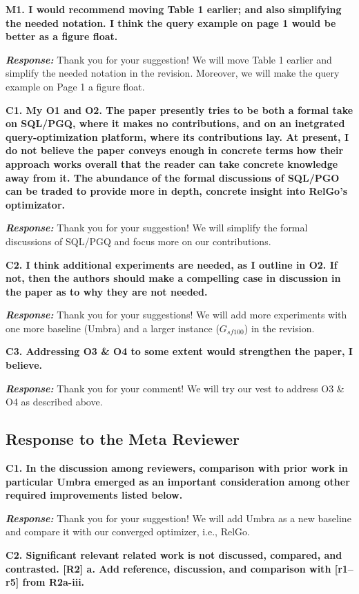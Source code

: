 \textbf{M1. I would recommend moving Table 1 earlier; and also simplifying the needed notation. I think the query example on page 1 would be better as a figure float. }

\textbf{\textit{Response: }}
Thank you for your suggestion! We will move Table 1 earlier and simplify the needed notation in the revision. Moreover, we will make the query example on Page 1 a figure float.

\textbf{
C1. My O1 and O2. The paper presently tries to be both a formal take on SQL/PGQ, where it makes no contributions, and on an inetgrated query-optimization platform, where its contributions lay. At present, I do not believe the paper conveys enough in concrete terms how their approach works overall that the reader can take concrete knowledge away from it. The abundance of the formal discussions of SQL/PGO can be traded to provide more in depth, concrete insight into RelGo's optimizator.}

\textbf{\textit{Response: }}
Thank you for your suggestion! We will simplify the formal discussions of SQL/PGQ and focus more on our contributions.


\textbf{
C2. I think additional experiments are needed, as I outline in O2. If not, then the authors should make a compelling case in discussion in the paper as to why they are not needed.}

\textbf{\textit{Response: }}
Thank you for your suggestions! We will add more experiments with one more baseline (Umbra) and a larger instance ($G_{sf100}$) in the revision.


\textbf{
C3. Addressing O3 \& O4 to some extent would strengthen the paper, I believe.}

\textbf{\textit{Response: }}
Thank you for your comment! We will try our vest to address O3 \& O4 as described above. 

\subsection{Response to the Meta Reviewer}

\textbf{
C1. In the discussion among reviewers, comparison with prior work in particular Umbra emerged as an important consideration among other required improvements listed below.}

\textbf{\textit{Response: }}
Thank you for your suggestion! We will add Umbra as a new baseline and compare it with our converged optimizer, i.e., RelGo.


\textbf{
C2. Significant relevant related work is not discussed, compared, and contrasted. [R2]
a. Add reference, discussion, and comparison with [r1–r5] from R2a-iii.
}

